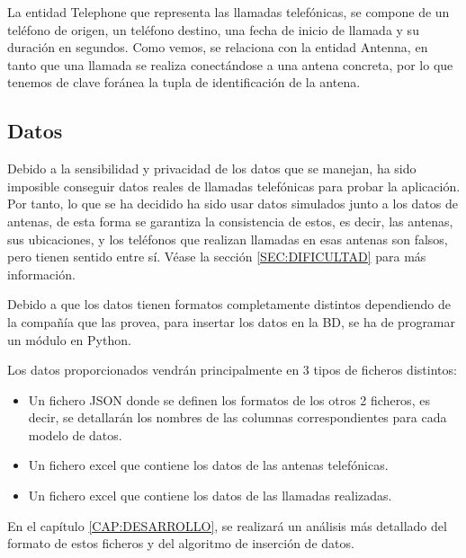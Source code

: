     La entidad Telephone que representa las llamadas telefónicas, se compone de un teléfono de origen, un teléfono destino, una fecha de inicio de llamada y su duración en segundos. Como vemos, se relaciona con la entidad Antenna, en tanto que una llamada se realiza conectándose a una antena concreta, por lo que tenemos de clave foránea la tupla de identificación de la antena.
       
       
  \subsection{Datos}
    Debido a la sensibilidad y privacidad de los datos que se manejan, ha sido imposible conseguir datos reales de llamadas telefónicas para probar la aplicación. Por tanto, lo que se ha decidido ha sido usar datos simulados junto a los datos de antenas, de esta forma se garantiza la consistencia de estos, es decir, las antenas, sus ubicaciones, y los teléfonos que realizan llamadas en esas antenas son falsos, pero tienen sentido entre sí. Véase la sección \ref{SEC:DIFICULTAD} para más información.

    Debido a que los datos tienen formatos completamente distintos dependiendo de la compañía que las provea, para insertar los datos en la BD, se ha de programar un módulo en Python.
    
    Los datos proporcionados vendrán principalmente en 3 tipos de ficheros distintos:
    \begin{itemize}
      \item Un fichero JSON donde se definen los formatos de los otros 2 ficheros, es decir, se detallarán los nombres de las columnas correspondientes para cada modelo de datos.
      \item Un fichero excel que contiene los datos de las antenas telefónicas.
      \item Un fichero excel que contiene los datos de las llamadas realizadas.
    \end{itemize}
  
    En el capítulo \ref{CAP:DESARROLLO}, se realizará un análisis más detallado del formato de estos ficheros y del algoritmo de inserción de datos.